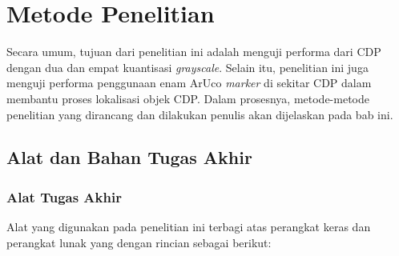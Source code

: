 \chapter{Metode Penelitian}
Secara umum, tujuan dari penelitian ini adalah menguji performa dari CDP dengan dua dan empat kuantisasi \emph{grayscale}. Selain itu, penelitian ini juga
menguji performa penggunaan enam ArUco \emph{marker} di sekitar CDP dalam membantu proses lokalisasi objek CDP. Dalam prosesnya, metode-metode penelitian yang
dirancang dan dilakukan penulis akan dijelaskan pada bab ini.

\section{Alat dan Bahan Tugas Akhir}

\subsection{Alat Tugas Akhir}

Alat yang digunakan pada penelitian ini terbagi atas perangkat keras dan perangkat lunak yang dengan rincian sebagai berikut:

